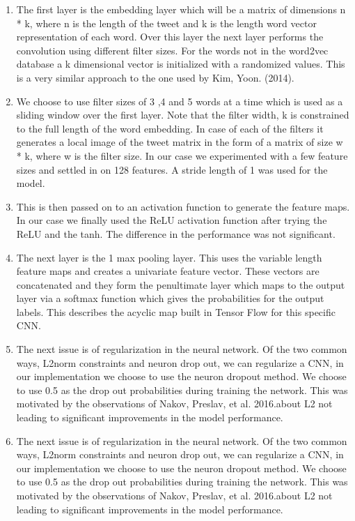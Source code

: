\documentclass[conference]{IEEEtran}
\begin{document}
\begin{enumerate}
\item 
The first layer is the embedding layer which will be a matrix of dimensions n * k, where n is the length of the tweet and k is the length word vector representation of each word. Over this layer the next layer performs the convolution using different filter sizes. For the words not in the word2vec database a  k dimensional vector is initialized with a randomized values. This is a very similar approach to the one used by Kim, Yoon. (2014). 
\item 
We choose to use filter sizes of 3 ,4 and 5 words at a time which is used as a sliding window over the first layer. Note that the filter width, k is constrained to the full length of the word embedding. In case of each of the filters it generates a local image of the tweet matrix in the form of a matrix of size w * k, where w is the filter size. In our case we experimented with a few feature sizes and settled in on 128 features. A stride length of 1 was used for the model. 
\item 
This is then passed on to an activation function to generate the feature maps. In our case we finally used the ReLU activation function after trying the ReLU and the tanh. The difference in the performance was not significant. 
\item
The next layer is the 1 max pooling layer. This uses the variable length feature maps and creates a univariate feature vector. These vectors are concatenated and they form the penultimate layer which maps to the output layer via a softmax function which gives the probabilities for the output labels. This describes the acyclic map built in Tensor Flow for this specific CNN.
\item
The next issue is of regularization in the neural network. Of the two common ways, L2norm constraints and neuron drop out, we can regularize a CNN, in our implementation we choose to use the neuron dropout method. We choose to use 0.5 as the drop out probabilities during training the network. This was motivated by the observations of Nakov, Preslav, et al. 2016.about L2 not leading to significant improvements in the model performance.
\item
The next issue is of regularization in the neural network. Of the two common ways, L2norm constraints and neuron drop out, we can regularize a CNN, in our implementation we choose to use the neuron dropout method. We choose to use 0.5 as the drop out probabilities during training the network. This was motivated by the observations of Nakov, Preslav, et al. 2016.about L2 not leading to significant improvements in the model performance.
\end{enumerate}
\end{document}
